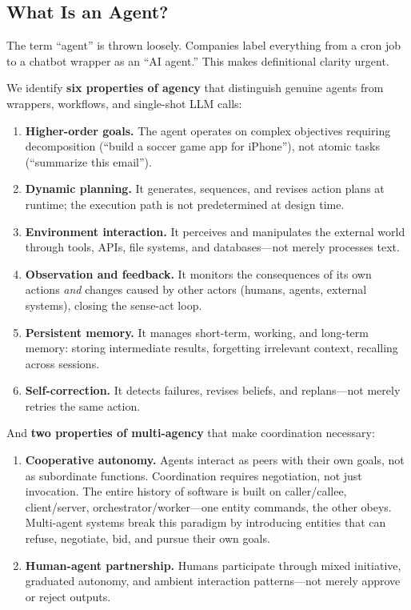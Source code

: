 \documentclass{article}
\begin{document}
\subsection{What Is an Agent?}
\label{sec:intro-agent-def}

The term ``agent'' is thrown loosely.  Companies label everything from a cron job to a
chatbot wrapper as an ``AI agent.''  This makes definitional clarity urgent.

We identify \textbf{six properties of agency} that distinguish genuine agents from
wrappers, workflows, and single-shot LLM calls:

\begin{enumerate}[nosep, label=\textbf{A\arabic*}., leftmargin=2em]
  \item \textbf{Higher-order goals.}  The agent operates on complex objectives requiring
    decomposition (``build a soccer game app for iPhone''), not atomic
    tasks (``summarize this email'').
  \item \textbf{Dynamic planning.}  It generates, sequences, and revises action plans at
    runtime; the execution path is not predetermined at design time.
  \item \textbf{Environment interaction.}  It perceives and manipulates the external world
    through tools, APIs, file systems, and databases---not merely processes text.
  \item \textbf{Observation and feedback.}  It monitors the consequences of its own actions
    \emph{and} changes caused by other actors (humans, agents, external systems),
    closing the sense-act loop.
  \item \textbf{Persistent memory.}  It manages short-term, working, and long-term memory:
    storing intermediate results, forgetting irrelevant context, recalling across sessions.
  \item \textbf{Self-correction.}  It detects failures, revises beliefs, and replans---not
    merely retries the same action.
\end{enumerate}

\noindent
And \textbf{two properties of multi-agency} that make coordination necessary:

\begin{enumerate}[nosep, label=\textbf{M\arabic*}., leftmargin=2em]
  \item \textbf{Cooperative autonomy.}  Agents interact as peers with their own goals, not
    as subordinate functions.  Coordination requires negotiation, not just invocation.
    The entire history of software is built on caller/callee, client/server,
    orchestrator/worker---one entity commands, the other obeys.  Multi-agent systems
    break this paradigm by introducing entities that can refuse, negotiate, bid, and
    pursue their own goals.
  \item \textbf{Human-agent partnership.}  Humans participate through mixed initiative,
    graduated autonomy, and ambient interaction patterns---not merely approve or reject
    outputs.
\end{enumerate}
\end{document}
